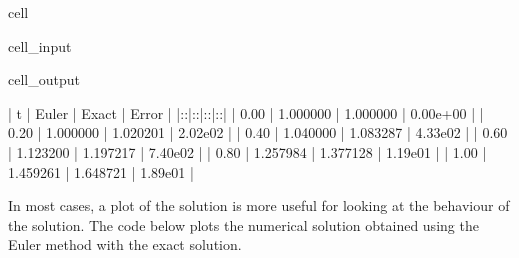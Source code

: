 \documentclass[letterpaper,10pt,english]{jupyterBook}
\begin{document}
\begin{sphinxuseclass}{cell}
\begin{sphinxVerbatimInput}
\begin{sphinxuseclass}{cell_input}
\end{sphinxuseclass}\end{sphinxVerbatimInput}
\begin{sphinxVerbatimOutput}

\begin{sphinxuseclass}{cell_output}
\begin{sphinxVerbatim}[commandchars=\\\{\}]
|  t   |   Euler   |   Exact   |  Error   |
|:\PYGZhy{}\PYGZhy{}\PYGZhy{}\PYGZhy{}:|:\PYGZhy{}\PYGZhy{}\PYGZhy{}\PYGZhy{}\PYGZhy{}\PYGZhy{}\PYGZhy{}\PYGZhy{}\PYGZhy{}:|:\PYGZhy{}\PYGZhy{}\PYGZhy{}\PYGZhy{}\PYGZhy{}\PYGZhy{}\PYGZhy{}\PYGZhy{}\PYGZhy{}:|:\PYGZhy{}\PYGZhy{}\PYGZhy{}\PYGZhy{}\PYGZhy{}\PYGZhy{}\PYGZhy{}\PYGZhy{}:|
| 0.00 |  1.000000 |  1.000000 | 0.00e+00 |
| 0.20 |  1.000000 |  1.020201 | 2.02e\PYGZhy{}02 |
| 0.40 |  1.040000 |  1.083287 | 4.33e\PYGZhy{}02 |
| 0.60 |  1.123200 |  1.197217 | 7.40e\PYGZhy{}02 |
| 0.80 |  1.257984 |  1.377128 | 1.19e\PYGZhy{}01 |
| 1.00 |  1.459261 |  1.648721 | 1.89e\PYGZhy{}01 |
\end{sphinxVerbatim}

\end{sphinxuseclass}\end{sphinxVerbatimOutput}

\end{sphinxuseclass}
\sphinxAtStartPar
In most cases, a plot of the solution is more useful for looking at the behaviour of the solution. The code below plots the numerical solution obtained using the Euler method with the exact solution.
\end{document}
